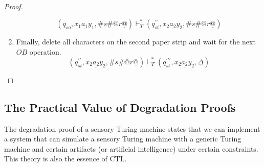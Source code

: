 \begin{proof}
\begin{enumerate}
    \begin{equation}
        (q_{so}, x_1\underline{a_1}y_1, \#s\#@r\underline{@}) \vdash_T^* (q_{st}^{\prime\prime}, x_2\underline{a_2}y_2, \#s\#@r\underline{@})
    \end{equation}
    \item Finally, delete all characters on the second paper strip and wait for the next $OB$ operation.
    \begin{equation}
        (q_{st}^{\prime\prime}, x_2\underline{a_2}y_2, \#s\#@r\underline{@}) \vdash_T^* (q_{st}^{\prime\prime\prime}, x_2\underline{a_2}y_2, \underline{\Delta})
    \end{equation}

\end{enumerate}
\end{proof}

\subsection{The Practical Value of Degradation Proofs}
The degradation proof of a sensory Turing machine states that we can implement a system that can simulate a sensory Turing machine with a generic Turing machine and certain artifacts (or artificial intelligence) under certain constraints. This theory is also the essence of CTL.

